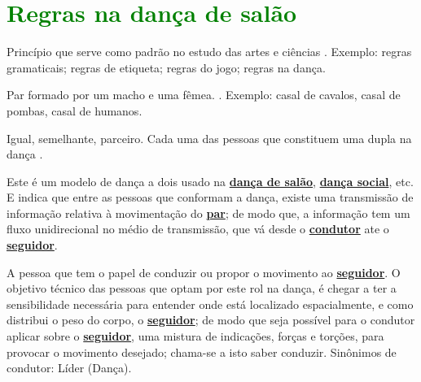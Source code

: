 
\chapter{\textcolor{green}{Regras na dança de salão}}

 
\begin{definition}[Regra:] 
\label{def:Regra}
Princípio que serve como padrão no estudo das artes e ciências \cite{priberamregra} \cite{dicioregra}.
Exemplo: regras gramaticais; regras de etiqueta; regras do jogo; regras na dança.
\end{definition}

\begin{definition}[Casal:] 
\label{def:Casal}
Par formado por um macho e uma fêmea. \cite{priberamcasal}.
Exemplo: casal de cavalos, casal de pombas, casal de humanos.
\end{definition}

\begin{definition}[Par:] 
\label{def:Par}
Igual, semelhante, parceiro.
Cada uma das pessoas que constituem uma dupla na dança \cite{priberampar}.
\end{definition}

\begin{definition} 
\label{def:ParadigmaConducao} 
Este é um modelo de dança a dois usado na \hyperref[def:DancaSalao]{\textbf{dança de salão}},
\hyperref[def:DancaSocial]{\textbf{dança social}}, etc. 
E indica que entre as pessoas que conformam a dança, 
existe uma transmissão de informação relativa à movimentação do \hyperref[def:Par]{\textbf{par}}; 
de modo que, a informação tem um fluxo unidirecional no médio de transmissão,
que vá desde o \hyperref[def:Condutor]{\textbf{condutor}} ate o \hyperref[def:Seguidor]{\textbf{seguidor}}. 
\end{definition}

\begin{definition} 
\label{def:Condutor} 
A pessoa que tem o papel de conduzir ou propor o movimento ao \hyperref[def:Seguidor]{\textbf{seguidor}}. 
O objetivo técnico das pessoas que optam por este rol na dança, é chegar 
a ter a sensibilidade necessária para entender onde está localizado espacialmente, 
e como distribui o peso do corpo, o \hyperref[def:Seguidor]{\textbf{seguidor}}; 
de modo que seja possível para o condutor aplicar sobre o \hyperref[def:Seguidor]{\textbf{seguidor}}, 
uma mistura de indicações, forças e torções,  
para provocar o movimento desejado;
chama-se a isto saber conduzir.
Sinônimos de condutor: Líder (Dança).
\end{definition}

